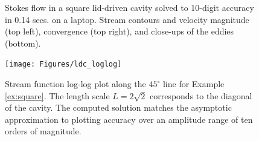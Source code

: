 \documentclass{article}
\begin{document}
\begin{example}
\begin{figure}[H]
\caption{Stokes flow in a square lid-driven cavity solved to 10-digit accuracy
   in 0.14 secs. on a laptop. Stream contours and velocity magnitude (top
   left), convergence (top right), and close-ups of the eddies (bottom).}
\label{fig:ldc}
\end{figure} 
\begin{figure}[H]
\centering
\texttt{[image: Figures/ldc\_loglog]}
\caption{Stream function log-log plot along the $45^\circ$ line for Example
   \ref{ex:square}. The length scale $L=2\sqrt{2}$ corresponds to the diagonal
   of the cavity. The computed solution matches the asymptotic approximation to
   plotting accuracy over an amplitude range of ten orders of magnitude.}
\label{fig:ldc_loglog}
\end{figure}

\end{example}
\end{document}

